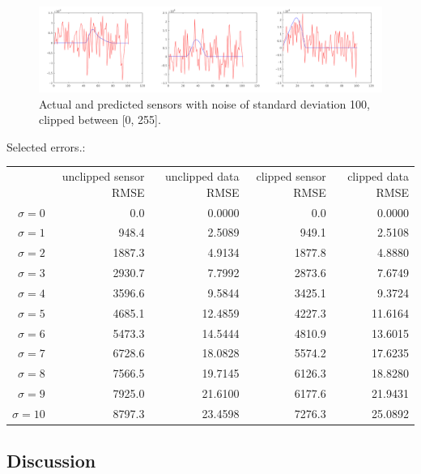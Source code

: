 \documentclass{article}
\begin{document}
\begin{figure}[!ht]
	\centering
	\includegraphics[width=160mm]{figs/sensors_noise_stddev100_clipped_chanall.png}
	\caption{Actual and predicted sensors with noise of standard deviation 100, clipped between [0, 255].}
\end{figure}

Selected errors.:

\begin{tabular}{r | r r r r}
                  & unclipped sensor RMSE & unclipped data RMSE & clipped sensor RMSE & clipped data RMSE   \\
    $\sigma = 0$  &    0.0 &  0.0000 &    0.0 &  0.0000 \\
    $\sigma = 1$  &  948.4 &  2.5089 &  949.1 &  2.5108 \\
    $\sigma = 2$  & 1887.3 &  4.9134 & 1877.8 &  4.8880 \\
    $\sigma = 3$  & 2930.7 &  7.7992 & 2873.6 &  7.6749 \\
    $\sigma = 4$  & 3596.6 &  9.5844 & 3425.1 &  9.3724 \\
    $\sigma = 5$  & 4685.1 & 12.4859 & 4227.3 & 11.6164 \\
    $\sigma = 6$  & 5473.3 & 14.5444 & 4810.9 & 13.6015 \\
    $\sigma = 7$  & 6728.6 & 18.0828 & 5574.2 & 17.6235 \\
    $\sigma = 8$  & 7566.5 & 19.7145 & 6126.3 & 18.8280 \\
    $\sigma = 9$  & 7925.0 & 21.6100 & 6177.6 & 21.9431 \\
    $\sigma = 10$ & 8797.3 & 23.4598 & 7276.3 & 25.0892 \\
\end{tabular}

\subsection{Discussion}
\end{document}
